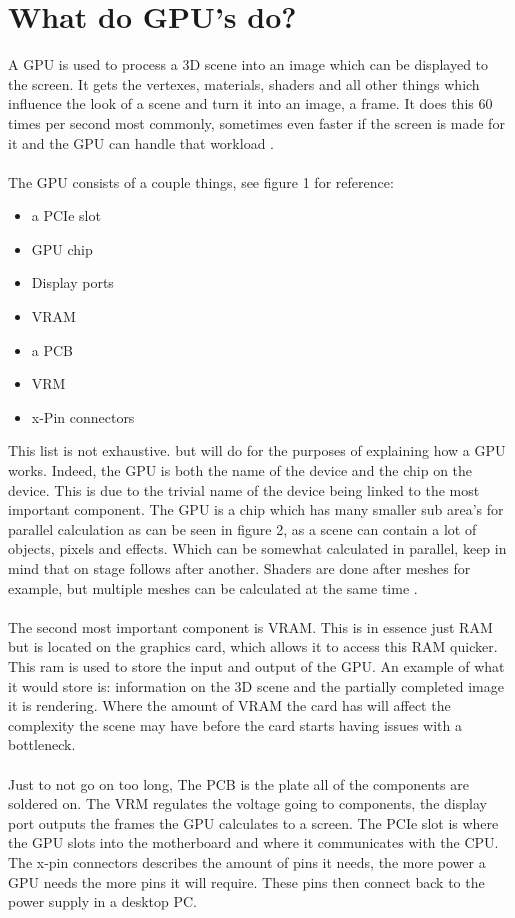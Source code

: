 \section{What do GPU's do?}
\label{sec:processor}
A GPU is used to process a 3D scene into an image which can be displayed to the screen. It gets the vertexes, materials, shaders and all other things which influence the look of a scene and turn it into an image, a frame. It does this 60 times per second most commonly, sometimes even faster if the screen is made for it and the GPU can handle that workload \cite{document1}. 
\\\\
The GPU consists of a couple things, see figure 1 for reference:
\begin{itemize}
	\item a PCIe slot
	\item GPU chip
	\item Display ports
	\item VRAM
	\item a PCB
	\item VRM
	\item x-Pin connectors
\end{itemize}
This list is not exhaustive. but will do for the purposes of explaining how a GPU works. Indeed, the GPU is both the name of the device and the chip on the device. This is due to the trivial name of the device being linked to the most important component. The GPU is a chip which has many smaller sub area's for parallel calculation as can be seen in figure 2, as a scene can contain a lot of objects, pixels and effects. Which can be somewhat calculated in parallel, keep in mind that on stage follows after another. Shaders are done after meshes for example, but multiple meshes can be calculated at the same time \cite{document1}. 
\\\\
The second most important component is VRAM. This is in essence just RAM but is located on the graphics card, which allows it to access this RAM quicker. This ram is used to store the input and output of the GPU. An example of what it would store is: information on the 3D scene and the partially completed image it is rendering. Where the amount of VRAM the card has will affect the complexity the scene may have before the card starts having issues with a bottleneck. 
\\\\
Just to not go on too long, The PCB is the plate all of the components are soldered on. The VRM regulates the voltage going to components, the display port outputs the frames the GPU calculates to a screen. The PCIe slot is where the GPU slots into the motherboard and where it communicates with the CPU. The x-pin connectors describes the amount of pins it needs, the more power a GPU needs the more pins it will require. These pins then connect back to the power supply in a desktop PC. 